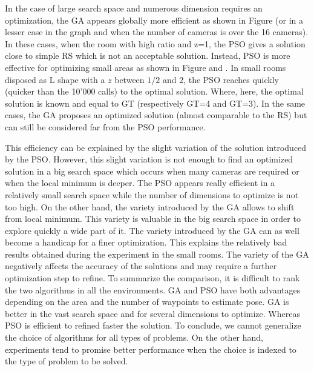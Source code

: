 In the case of large search space and numerous dimension requires an optimization, the GA appears globally more efficient as shown in Figure  (or in a lesser case in the graph   and   when the number of cameras is over the 16 cameras). In these cases, when  the room with high ratio and z=1, the PSO gives a solution close to simple RS which is not an acceptable solution.
 Instead, PSO is more effective for optimizing small areas as shown in Figure  and . In small rooms disposed as L shape with a $z$ between $1/2$ and $2$, the PSO reaches quickly (quicker than the 10'000 calls) to the optimal solution. Where, here, the optimal solution is known and equal to GT (respectively GT=4 and GT=3). In the same cases, the GA proposes an optimized solution (almost comparable to the RS) but can still be considered far from the PSO performance.
 
 This efficiency can be explained by the slight variation of the solution introduced by the PSO. However, this slight variation is not enough to find an optimized solution in a big search space which occurs when many cameras are required or when the local minimum is deeper. The PSO appears really efficient in a relatively small search space while the number of dimensions to optimize is not too high.
 On the other hand, the variety  introduced by the GA allows to shift from local minimum. This variety is valuable in the big search space in order to explore quickly a wide part of it. The variety introduced by the GA can as well become a handicap for a finer optimization. This explains the relatively bad results obtained during the experiment in the small rooms. The variety of the GA negatively affects the accuracy of the solutions and may require a further optimization step to refine. 
To summarize the comparison, it is difficult to rank the two algorithms in all the environments. GA and PSO have both advantages depending on the area and the number of waypoints to estimate pose. GA is better in the vast search space and for several dimensions to optimize. Whereas PSO is efficient to refined faster the solution.  To conclude, we cannot generalize the choice of algorithms for all types of problems. On the other hand, experiments tend to promise better performance when the choice is indexed to the type of problem to be solved.
 
